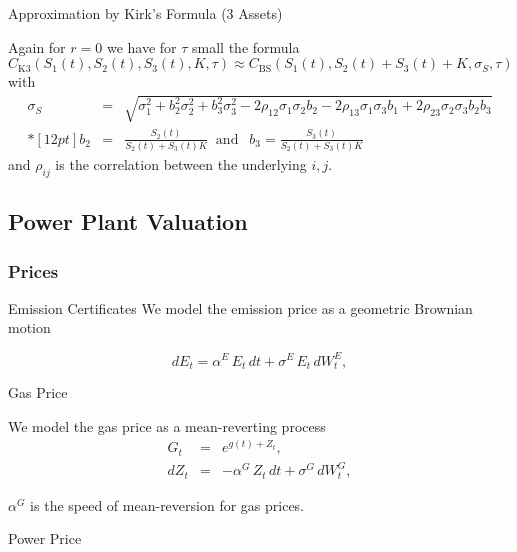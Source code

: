 {Approximation by Kirk's Formula (3 Assets)}

Again for $r=0$ we have for  $\tau$ small the formula
{\small
\begin{equation}
 C_{\mbox{K3}}(S_1(t), S_2(t), S_3(t), K, \tau) \approx
 C_{\mbox{BS}}(S_1(t), S_2(t)+S_3(t)+K, \sigma_S, \tau)
\label{kirk3}
\end{equation}
with
 $$
 \begin{array}{lll}
 \sigma_S & = & \sqrt{\sigma_1^2+b_2^2\sigma_2^2 +b_3^2\sigma_3^2
 - 2\rho_{12}\sigma_1\sigma_2b_2 - 2\rho_{13}\sigma_1\sigma_3b_1 + 2\rho_{23}\sigma_2\sigma_3b_2b_3}\\*[12pt]
 b_2 &=& \frac{S_2(t)}{S_2(t)+S_3(t) K}
 \;\;\mbox{and}  \;\;\
  b_3 = \frac{S_3(t)}{S_2(t)+S_3(t) K}
\end{array}$$
}
and $\rho_{ij}$ is the correlation between the underlying $i,j$.

\subsection{Power Plant Valuation}
\subsubsection{Prices}

{ Emission Certificates}
We model the emission price as a geometric Brownian motion

\begin{equation}
d{E}_t = \alpha^E\,E_t\,d{t} + \sigma^E\,E_t\,d{W}^E_t,
\label{co2}
\end{equation}

{Gas Price}






	We model the gas price as a mean-reverting process
\begin{eqnarray}
G_t & = & e^{g(t) + Z_t},  \nonumber \\
d{Z}_t & = & -\alpha^G\,Z_t\,d{t} + \sigma^G\,d{W}^G_t,
\label{gas}
\end{eqnarray}


	$\alpha^G$ is the speed of mean-reversion for gas prices.





{Power Price}






